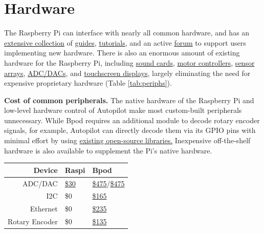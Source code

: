 \section{Hardware}
\label{sec:hardware}

The Raspberry Pi can interface with nearly all common hardware, and has an \href{https://www.raspberrypi.org/help/}{extensive collection} of \href{https://elinux.org/RPi_Guides}{guides}, \href{https://elinux.org/RPi_Tutorials}{tutorials}, and an active \href{https://www.raspberrypi.org/forums/}{forum} to support users implementing new hardware. There is also an enormous amount of existing hardware for the Raspberry Pi, including \href{https://www.hifiberry.com/}{sound cards}, \href{https://www.adafruit.com/product/2348}{motor controllers}, \href{https://www.digikey.com/product-detail/en/raspberry-pi/SENSE-HAT/1690-1013-ND/6196429}{sensor arrays}, \href{https://www.seeedstudio.com/Raspberry-Pi-High-Precision-AD-DA-Board-p-2765.html}{ADC/DACs}, and \href{https://www.digikey.com/product-detail/en/pimoroni-ltd/PIM369/1778-1221-ND/9521981}{touchscreen displays}, largely eliminating the need for expensive proprietary hardware (Table \ref{tab:periphs}). 

\begin{margintable}[0.3cm]
\caption{
\textbf{Cost of common peripherals.} The native hardware of the Raspberry Pi and low-level hardware control of Autopilot make most custom-built peripherals unnecessary. While Bpod requires an additional module to decode rotary encoder signals, for example, Autopilot can directly decode them via its GPIO pins with minimal effort by using \href{https://pypi.org/project/pigpio-encoder/}{existing open-source libraries.} Inexpensive off-the-shelf hardware is also available to supplement the Pi's native hardware.}
\label{tab:periphs}
\noindent\begin{tabularx}{\linewidth}{Rll}
\toprule
\textbf{Device} & Raspi & Bpod \\
\midrule
ADC/DAC & \href{https://www.seeedstudio.com/Raspberry-Pi-High-Precision-AD-DA-Board-p-2765.html}{\$30} &  \href{https://sanworks.io/shop/viewproduct?productID=1021}{\$475}/\href{https://sanworks.io/shop/viewproduct?productID=1013}{\$475}\\
I2C & \$0 & \href{https://sanworks.io/shop/viewproduct?productID=1019}{\$165} \\
Ethernet & \$0 & \href{https://sanworks.io/shop/viewproduct?productID=1025}{\$235} \\
Rotary Encoder & \$0 &  \href{https://sanworks.io/shop/viewproduct?productID=1022}{\$135}\\
\bottomrule
\end{tabularx}
\end{margintable}

